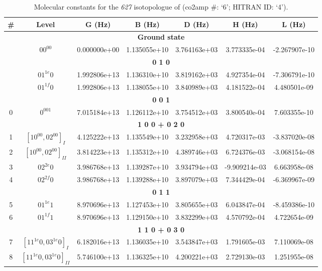 \begin{table}[h!]
\caption{Molecular constants for the \textit{627} isotopologue of  (co2amp \#: ‘6’; HITRAN ID: ‘4’).}
\label{table:constants_627}
\centering
\begin{tabular}{|c|c|c|c|c|c|c|}
\hline
\textbf{\#} & \textbf{Level} & \textbf{G (Hz)} & \textbf{B (Hz)} & \textbf{D (Hz)} & \textbf{H (Hz)} & \textbf{L (Hz)} \\ \hline
\multicolumn{7}{|c|}{\textbf{Ground state}} \\ \hline
 & $00^00$ & 0.000000e+00 & 1.135055e+10 & 3.764163e+03 & 3.773335e-04 & -2.267907e-10 \\ \hline
\multicolumn{7}{|c|}{\textbf{0 1 0}} \\ \hline
 & $01^{1e}0$ & 1.992806e+13 & 1.136310e+10 & 3.819162e+03 & 4.927354e-04 & -7.306791e-10 \\ \hline
 & $01^{1f}0$ & 1.992806e+13 & 1.138055e+10 & 3.840989e+03 & 4.181522e-04 & 4.480501e-09 \\ \hline
\multicolumn{7}{|c|}{\textbf{0 0 1}} \\ \hline
0 & $0^001$ & 7.015184e+13 & 1.126112e+10 & 3.754512e+03 & 3.800540e-04 & 7.603355e-10 \\ \hline
\multicolumn{7}{|c|}{\textbf{1 0 0 + 0 2 0}} \\ \hline
1 & $[10^00, 02^00]_{I}$ & 4.125222e+13 & 1.135549e+10 & 3.232958e+03 & 4.720317e-03 & -3.837020e-08 \\ \hline
2 & $[10^00, 02^00]_{II}$ & 3.814223e+13 & 1.135312e+10 & 4.389746e+03 & 6.724376e-03 & -3.068154e-08 \\ \hline
3 & $02^{2e}0$ & 3.986768e+13 & 1.139287e+10 & 3.934794e+03 & -9.909214e-03 & 6.663958e-08 \\ \hline
4 & $02^{2f}0$ & 3.986768e+13 & 1.139288e+10 & 3.897079e+03 & 7.344429e-04 & -6.369967e-09 \\ \hline
\multicolumn{7}{|c|}{\textbf{0 1 1}} \\ \hline
5 & $01^{1e}1$ & 8.970696e+13 & 1.127453e+10 & 3.805655e+03 & 6.043847e-04 & -8.459386e-10 \\ \hline
6 & $01^{1f}1$ & 8.970696e+13 & 1.129150e+10 & 3.832299e+03 & 4.570792e-04 & 4.722654e-09 \\ \hline
\multicolumn{7}{|c|}{\textbf{1 1 0 + 0 3 0}} \\ \hline
7 & $[11^{1e}0, 03^{1e}0]_{I}$ & 6.182016e+13 & 1.136035e+10 & 3.543847e+03 & 1.791605e-03 & 7.110069e-08 \\ \hline
8 & $[11^{1e}0, 03^{1e}0]_{II}$ & 5.746100e+13 & 1.136325e+10 & 4.200221e+03 & 2.729130e-03 & 1.251955e-08 \\ \hline

\end{tabular}
\end{table}
